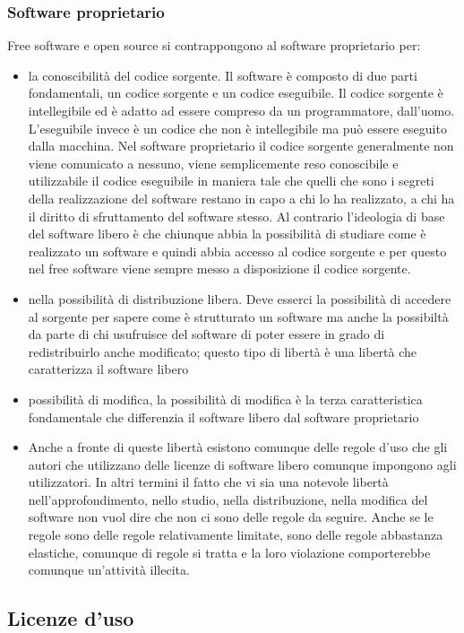 \subsubsection{Software proprietario}
Free software e open source si contrappongono al software proprietario per:
\begin{itemize}
    \item la conoscibilità del codice sorgente. Il software è composto di due parti fondamentali, un codice sorgente e un codice eseguibile. Il codice sorgente è intellegibile ed è adatto ad essere compreso da un programmatore, dall'uomo. L'eseguibile invece è un codice che non è intellegibile ma può essere eseguito dalla macchina. Nel software proprietario il codice sorgente generalmente non viene comunicato a nessuno, viene semplicemente reso conoscibile e utilizzabile il codice eseguibile in maniera tale che quelli che sono i segreti della realizzazione del software restano in capo a chi lo ha realizzato, a chi ha il diritto di sfruttamento del software stesso. Al contrario l'ideologia di base del software libero è che chiunque abbia la possibilità di studiare come è realizzato un software e quindi abbia accesso al codice sorgente e per questo nel free software viene sempre messo a disposizione il codice sorgente.
    \item nella possibilità di distribuzione libera. Deve esserci la possibilità di accedere al sorgente per sapere come è strutturato un software ma anche la possibiltà da parte di chi usufruisce del software di poter essere in grado di redistribuirlo anche modificato; questo tipo di libertà è una libertà che caratterizza il software libero
    \item possibilità di modifica, la possibilità di modifica è la terza caratteristica fondamentale che differenzia il software libero dal software proprietario
    \item Anche a fronte di queste libertà esistono comunque delle regole d'uso che gli autori che utilizzano delle licenze di software libero comunque impongono agli utilizzatori. In altri termini il fatto che vi sia una notevole libertà nell'approfondimento, nello studio, nella distribuzione, nella modifica del software non vuol dire che non ci sono delle regole da seguire. Anche se le regole sono delle regole relativamente limitate, sono delle regole abbastanza elastiche, comunque di regole si tratta e la loro violazione comporterebbe comunque un'attività illecita.
\end{itemize}

\subsection{Licenze d'uso}

